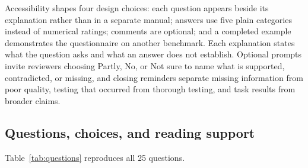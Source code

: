 \documentclass[10pt,conference]{IEEEtran}
\begin{document}
Accessibility shapes four design choices: each question appears beside its explanation rather than in a separate manual; answers use five plain categories instead of numerical ratings; comments are optional; and a completed example demonstrates the questionnaire on another benchmark. Each explanation states what the question asks and what an answer does not establish. Optional prompts invite reviewers choosing Partly, No, or Not sure to name what is supported, contradicted, or missing, and closing reminders separate missing information from poor quality, testing that occurred from thorough testing, and task results from broader claims.

\subsection{Questions, choices, and reading support}
Table~\ref{tab:questions} reproduces all 25 questions.
\end{document}
